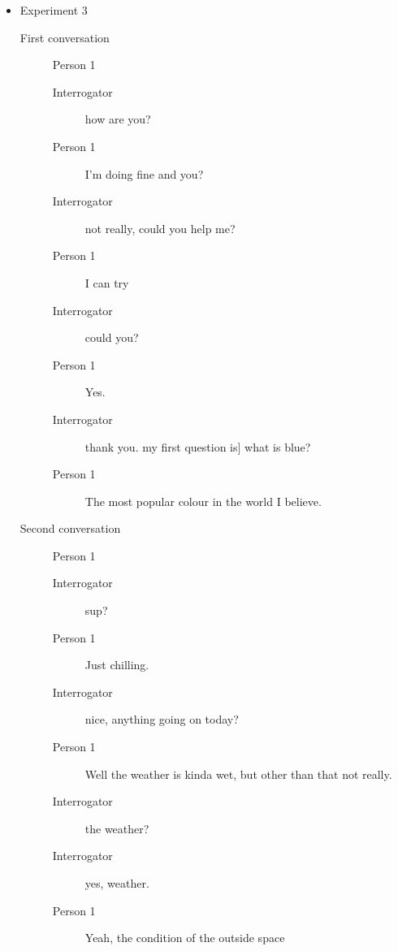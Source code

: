 \begin{itemize}
   \item Experiment 3
      \begin{description}
         \item [First conversation] Person 1
            \begin{description}
               \item [Interrogator] how are you?
               \item [Person 1] I'm doing fine and you?
               \item [Interrogator] not really, could you help me?
               \item [Person 1] I can try
               \item [Interrogator] could you?
               \item [Person 1] Yes.
            \item [Interrogator] thank you. my first question is] what is blue?
            \item [Person 1] The most popular colour in the world I believe.
         \end{description}
      \item [Second conversation] Person 1
         \begin{description}
            \item [Interrogator] sup?
            \item [Person 1] Just chilling.
            \item [Interrogator] nice, anything going on today?
            \item [Person 1] Well the weather is kinda wet, but other than that not really.
            \item [Interrogator] the weather?
            \item [Interrogator] yes, weather.
            \item [Person 1] Yeah, the condition of the outside space
         \end{description}
   \end{description}


\end{itemize}
